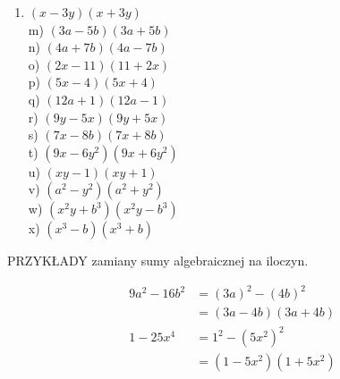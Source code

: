\documentclass[10pt]{article}
\begin{document}
\begin{enumerate}
  \item \((x-3 y)(x+3 y)\)\\
m) \((3 a-5 b)(3 a+5 b)\)\\
n) \((4 a+7 b)(4 a-7 b)\)\\
o) \((2 x-11)(11+2 x)\)\\
p) \((5 x-4)(5 x+4)\)\\
q) \((12 a+1)(12 a-1)\)\\
r) \((9 y-5 x)(9 y+5 x)\)\\
s) \((7 x-8 b)(7 x+8 b)\)\\
t) \(\left(9 x-6 y^{2}\right)\left(9 x+6 y^{2}\right)\)\\
u) \((x y-1)(x y+1)\)\\
v) \(\left(a^{2}-y^{2}\right)\left(a^{2}+y^{2}\right)\)\\
w) \(\left(x^{2} y+b^{3}\right)\left(x^{2} y-b^{3}\right)\)\\
x) \(\left(x^{3}-b\right)\left(x^{3}+b\right)\)
\end{enumerate}

PRZYKŁADY zamiany sumy algebraicznej na iloczyn.

\[
\begin{aligned}
9 a^{2}-16 b^{2} & =(3 a)^{2}-(4 b)^{2} \\
& =(3 a-4 b)(3 a+4 b) \\
1-25 x^{4} & =1^{2}-\left(5 x^{2}\right)^{2} \\
& =\left(1-5 x^{2}\right)\left(1+5 x^{2}\right)
\end{aligned}
\]
\end{document}
